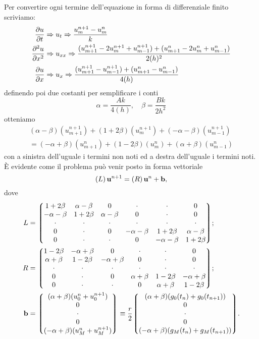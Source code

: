 \documentclass[10pt,a4paper]{article}
\begin{document}
Per convertire ogni termine dell'equazione in forma di differenziale finito scriviamo:
\begin{align}
	\pdv{u}{t} &\Rightarrow u_t \Rightarrow \frac{u_m^{n+1}-u_m^n}{k}\\
	\pdv[2]{u}{x} &\Rightarrow u_{xx} \Rightarrow \frac{(u_{m+1}^{n+1}-2u_m^{n+1}+u_{m-1}^{n+1}) +(u_{m+1}^{n}-2u_m^{n}+u_{m-1}^{n})}{2(h)^2}\\
	\pdv{u}{x} &\Rightarrow u_x \Rightarrow \frac{(u_{m+1}^{n+1}-u_{m-1}^{n+1})+(u_{m+1}^n -u_{m-1}^n)}{4(h)}
\end{align}
definendo poi due costanti per semplificare i conti
\begin{equation}
	\alpha = \frac{Ak}{4(h)}, \quad \beta = \frac{Bk}{2 h^2}
\end{equation}
otteniamo
\begin{multline}
	(\alpha - \beta)(u_{m+1}^{n+1}) + (1 + 2\beta)(u_m^{n+1}) + (-\alpha -\beta)(u_{m-1}^{n+1}) \\= (-\alpha + \beta)(u_{m+1}^n) +(1 -2\beta)(u_m^n) + (\alpha + \beta)(u_{m-1}^n)
\end{multline}
con a sinistra dell'uguale i termini non noti ed a destra dell'uguale i termini noti. È evidente come il problema può venir posto in forma vettoriale
\begin{equation}
	\left(L\right)\vb{u}^{n+1} = \left(R\right)\vb{u}^n + \vb{b},
\end{equation}
dove
\begin{align}
	L &= \mqty*(1+2\beta & \alpha - \beta & 0 & \cdot & \cdot & 0 \\ -\alpha -\beta & 1+2\beta & \alpha-\beta & 0 & \cdot & 0 \\ \cdot & \cdot & \cdot & \cdot & \cdot & \cdot \\ 0 & \cdot & 0 & -\alpha -\beta & 1+2\beta & \alpha-\beta \\ 0 & \cdot & \cdot & 0 & -\alpha-\beta & 1+2\beta);\\
	R &= \mqty*(1-2\beta & -\alpha + \beta & 0 & \cdot & \cdot & 0 \\ \alpha +\beta & 1-2\beta & -\alpha+\beta & 0 & \cdot & 0 \\ \cdot & \cdot & \cdot & \cdot & \cdot & \cdot \\ 0 & \cdot & 0 & \alpha +\beta & 1-2\beta & -\alpha+\beta \\ 0 & \cdot & \cdot & 0 & \alpha+\beta & 1-2\beta);\\
	\vb{b} &= \mqty*((\alpha + \beta)(u_0^n + u_0^{n+1}) \\ 0 \\ \cdot \\ 0 \\ (-\alpha + \beta)(u_M^n + u_M^{n+1})) \equiv \frac{r}{2}\mqty*((\alpha + \beta)(g_0(t_n) + g_0(t_{n+1})) \\ 0 \\ \cdot \\ 0 \\ (-\alpha + \beta)(g_M(t_n) + g_M(t_{n+1}))).
\end{align}
\end{document}
